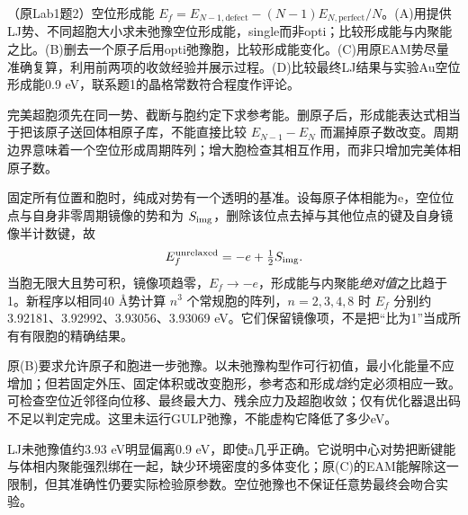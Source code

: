 \begin{exercise}\label{task:lab1-2}
（原Lab1题2）空位形成能 $E_f=E_{N-1,\mathrm{defect}}-(N-1)E_{N,\mathrm{perfect}}/N$。(A)用提供LJ势、不同超胞大小求未弛豫空位形成能，single而非opti；比较形成能与内聚能之比。(B)删去一个原子后用opti弛豫胞，比较形成能变化。(C)用原EAM势尽量准确复算，利用前两项的收敛经验并展示过程。(D)比较最终LJ结果与实验Au空位形成能0.9 eV，联系题1的晶格常数符合程度作评论。
\end{exercise}
\begin{solution}
完美超胞须先在同一势、截断与胞约定下求参考能。删原子后，形成能表达式相当于把该原子送回体相原子库，不能直接比较 $E_{N-1}-E_N$ 而漏掉原子数改变。周期边界意味着一个空位形成周期阵列；增大胞检查其相互作用，而非只增加完美体相原子数。

固定所有位置和胞时，纯成对势有一个透明的基准。设每原子体相能为e，空位位点与自身非零周期镜像的势和为 $S_{\rm img}$，删除该位点去掉与其他位点的键及自身镜像半计数键，故
\[
 E_f^{\rm unrelaxed}=-e+\tfrac12 S_{\rm img}.
\]
当胞无限大且势可积，镜像项趋零，$E_f\to-e$，形成能与内聚能\emph{绝对值}之比趋于1。新程序以相同40 \AA{}势计算 $n^3$ 个常规胞的阵列，$n=2,3,4,8$ 时 $E_f$ 分别约3.92181、3.92992、3.93056、3.93069 eV。它们保留镜像项，不是把“比为1”当成所有有限胞的精确结果。

原(B)要求允许原子和胞进一步弛豫。以未弛豫构型作可行初值，最小化能量不应增加；但若固定外压、固定体积或改变胞形，参考态和形成\emph{焓}约定必须相应一致。可检查空位近邻径向位移、最终最大力、残余应力及超胞收敛；仅有优化器退出码不足以判定完成。这里未运行GULP弛豫，不能虚构它降低了多少eV。

LJ未弛豫值约3.93 eV明显偏离0.9 eV，即使a几乎正确。它说明中心对势把断键能与体相内聚能强烈绑在一起，缺少环境密度的多体变化；原(C)的EAM能解除这一限制，但其准确性仍要实际检验原参数。空位弛豫也不保证任意势最终会吻合实验。
\end{solution}

